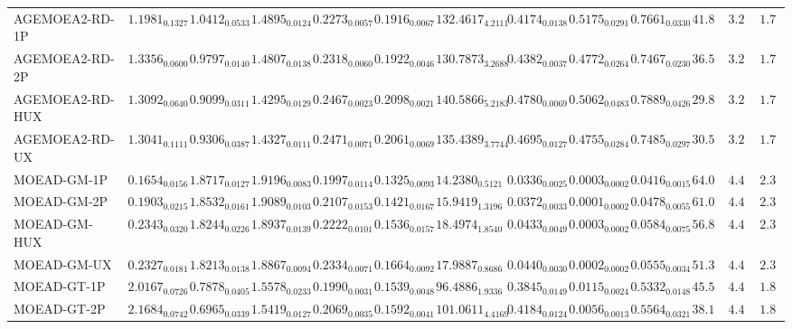 \documentclass[11pt,a4paper]{article}
\begin{document}
\begin{table}[H]
{\begin{tabular}{lcccccccccccc}
AGEMOEA2-RD-1P & $1.1981_{0.1327}$ & $1.0412_{0.0533}$ & $1.4895_{0.0124}$ & $0.2273_{0.0057}$ & $0.1916_{0.0067}$ & $132.4617_{4.2111}$ & $0.4174_{0.0138}$ & $0.5175_{0.0291}$ & $0.7661_{0.0330}$ & $41.89$ & $3.22$ & $\mathbf{1.78}$ \\
AGEMOEA2-RD-2P & $1.3356_{0.0600}$ & $0.9797_{0.0140}$ & $1.4807_{0.0138}$ & $0.2318_{0.0060}$ & $0.1922_{0.0046}$ & $130.7873_{3.2688}$ & $0.4382_{0.0037}$ & $0.4772_{0.0264}$ & $0.7467_{0.0230}$ & $36.56$ & $3.22$ & $\mathbf{1.78}$ \\
AGEMOEA2-RD-HUX & $1.3092_{0.0640}$ & $0.9099_{0.0311}$ & $1.4295_{0.0129}$ & $0.2467_{0.0023}$ & $0.2098_{0.0021}$ & $140.5866_{5.2183}$ & $\mathbf{0.4780}_{0.0069}$ & $0.5062_{0.0483}$ & $0.7889_{0.0426}$ & $29.89$ & $3.22$ & $\mathbf{1.78}$ \\
AGEMOEA2-RD-UX & $1.3041_{0.1111}$ & $0.9306_{0.0387}$ & $1.4327_{0.0111}$ & $0.2471_{0.0071}$ & $0.2061_{0.0069}$ & $135.4389_{3.7744}$ & $0.4695_{0.0127}$ & $0.4755_{0.0284}$ & $0.7485_{0.0297}$ & $30.56$ & $3.22$ & $\mathbf{1.78}$ \\
MOEAD-GM-1P & $0.1654_{0.0156}$ & $1.8717_{0.0127}$ & $1.9196_{0.0083}$ & $0.1997_{0.0114}$ & $0.1325_{0.0093}$ & $14.2380_{0.5121}$ & $0.0336_{0.0025}$ & $0.0003_{0.0002}$ & $0.0416_{0.0015}$ & $64.00$ & $4.44$ & $2.33$ \\
MOEAD-GM-2P & $0.1903_{0.0215}$ & $1.8532_{0.0161}$ & $1.9089_{0.0103}$ & $0.2107_{0.0153}$ & $0.1421_{0.0167}$ & $15.9419_{1.3196}$ & $0.0372_{0.0033}$ & $\mathbf{0.0001}_{0.0002}$ & $0.0478_{0.0055}$ & $61.00$ & $4.44$ & $2.33$ \\
MOEAD-GM-HUX & $0.2343_{0.0320}$ & $1.8244_{0.0226}$ & $1.8937_{0.0139}$ & $0.2222_{0.0101}$ & $0.1536_{0.0157}$ & $18.4974_{1.8540}$ & $0.0433_{0.0049}$ & $0.0003_{0.0002}$ & $0.0584_{0.0075}$ & $56.89$ & $4.44$ & $2.33$ \\
MOEAD-GM-UX & $0.2327_{0.0181}$ & $1.8213_{0.0138}$ & $1.8867_{0.0094}$ & $0.2334_{0.0071}$ & $0.1664_{0.0092}$ & $17.9887_{0.8686}$ & $0.0440_{0.0030}$ & $0.0002_{0.0002}$ & $0.0555_{0.0034}$ & $51.33$ & $4.44$ & $2.33$ \\
MOEAD-GT-1P & $2.0167_{0.0726}$ & $0.7878_{0.0405}$ & $1.5578_{0.0233}$ & $0.1990_{0.0031}$ & $0.1539_{0.0048}$ & $96.4886_{1.9336}$ & $0.3845_{0.0149}$ & $0.0115_{0.0024}$ & $0.5332_{0.0148}$ & $45.56$ & $4.44$ & $1.89$ \\
MOEAD-GT-2P & $2.1684_{0.0742}$ & $0.6965_{0.0339}$ & $1.5419_{0.0127}$ & $0.2069_{0.0035}$ & $0.1592_{0.0041}$ & $101.0611_{4.4169}$ & $0.4184_{0.0124}$ & $0.0056_{0.0013}$ & $0.5564_{0.0321}$ & $38.11$ & $4.44$ & $1.89$ \\

\end{tabular}}
\end{table}
\end{document}
